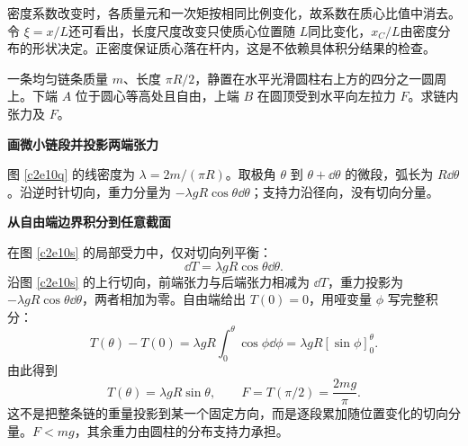 \begin{solution}
密度系数改变时，各质量元和一次矩按相同比例变化，故系数在质心比值中消去。令 $\xi=x/L$还可看出，长度尺度改变只使质心位置随 $L$同比变化，$x_C/L$由密度分布的形状决定。正密度保证质心落在杆内，这是不依赖具体积分结果的检查。
\end{solution}

\begin{question}
\begin{example}[光滑圆柱上的链条]
一条均匀链条质量 $m$、长度 $\pi R/2$，静置在水平光滑圆柱右上方的四分之一圆周上。下端 $A$ 位于圆心等高处且自由，上端 $B$ 在圆顶受到水平向左拉力 $F$。求链内张力及 $F$。
\end{example}
\end{question}
\begin{solution}\textbf{画微小链段并投影两端张力}\par\nobreak
图 \ref{c2e10q} 的线密度为 $\lambda=2m/(\pi R)$。取极角 $\theta$ 到 $\theta+\dd\theta$ 的微段，弧长为 $R\dd\theta$。沿逆时针切向，重力分量为 $-\lambda gR\cos\theta\dd\theta$；支持力沿径向，没有切向分量。



\par\medskip{}\noindent\textbf{从自由端边界积分到任意截面}\par\nobreak
在图 \ref{c2e10s} 的局部受力中，仅对切向列平衡：
\[
 \dd T=\lambda gR\cos\theta\dd\theta.
\]
沿图 \ref{c2e10s} 的上行切向，前端张力与后端张力相减为 $\dd T$，重力投影为 $-\lambda gR\cos\theta\dd\theta$，两者相加为零。自由端给出 $T(0)=0$，用哑变量 $\phi$ 写完整积分：
\[
 T(\theta)-T(0)=\lambda gR\int_0^\theta\cos\phi\dd\phi
 =\lambda gR[\sin\phi]_0^\theta.
\]
由此得到
\[
 T(\theta)=\lambda gR\sin\theta,\qquad
 F=T(\pi/2)=\boxed{\frac{2mg}{\pi}}.
\]
这不是把整条链的重量投影到某一个固定方向，而是逐段累加随位置变化的切向分量。$F<mg$，其余重力由圆柱的分布支持力承担。
\end{solution}

